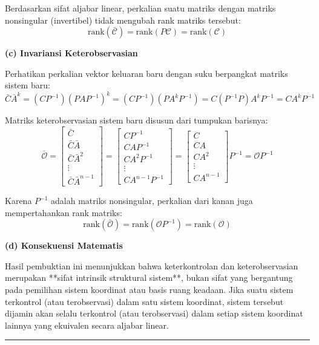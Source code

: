 \documentclass[11pt,a4paper]{article}
\begin{document}
Berdasarkan sifat aljabar linear, perkalian suatu matriks dengan matriks nonsingular (invertibel) tidak mengubah rank matriks tersebut:
$$\text{rank}(\bar{\mathcal{C}}) = \text{rank}(P \mathcal{C}) = \text{rank}(\mathcal{C})$$

\textbf{(c) Invariansi Keterobservasian}

Perhatikan perkalian vektor keluaran baru dengan suku berpangkat matriks sistem baru:
$$\bar{C} \bar{A}^k = (C P^{-1}) (P A P^{-1})^k = (C P^{-1})(P A^k P^{-1}) = C (P^{-1} P) A^k P^{-1} = C A^k P^{-1}$$

Matriks keterobservasian sistem baru disusun dari tumpukan barisnya:
$$\bar{\mathcal{O}} = \begin{bmatrix} \bar{C} \\ \bar{C}\bar{A} \\ \bar{C}\bar{A}^2 \\ \vdots \\ \bar{C}\bar{A}^{n-1} \end{bmatrix} = \begin{bmatrix} C P^{-1} \\ C A P^{-1} \\ C A^2 P^{-1} \\ \vdots \\ C A^{n-1} P^{-1} \end{bmatrix} = \begin{bmatrix} C \\ CA \\ CA^2 \\ \vdots \\ CA^{n-1} \end{bmatrix} P^{-1} = \mathcal{O} P^{-1}$$

Karena $P^{-1}$ adalah matriks nonsingular, perkalian dari kanan juga mempertahankan rank matriks:
$$\text{rank}(\bar{\mathcal{O}}) = \text{rank}(\mathcal{O} P^{-1}) = \text{rank}(\mathcal{O})$$

\textbf{(d) Konsekuensi Matematis}

Hasil pembuktian ini menunjukkan bahwa keterkontrolan dan keterobservasian merupakan **sifat intrinsik struktural sistem**, bukan sifat yang bergantung pada pemilihan sistem koordinat atau basis ruang keadaan. Jika suatu sistem terkontrol (atau terobservasi) dalam satu sistem koordinat, sistem tersebut dijamin akan selalu terkontrol (atau terobservasi) dalam setiap sistem koordinat lainnya yang ekuivalen secara aljabar linear.

\vspace{12pt}
\hrule
\vspace{10pt}
\end{document}

